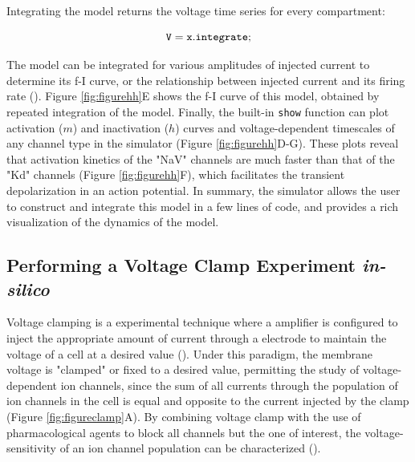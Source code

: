 \documentclass{frontiersSCNS} %
\begin{document}
Integrating the model returns the voltage time series for every compartment:

\begin{equation}
{\tt V = x.integrate;}
\end{equation}

The model can be integrated for various amplitudes of injected current to determine its f-I curve, or the relationship between injected current and its firing rate (\cite{kisperskyIncreaseSodiumConductance2012}). Figure \ref{fig:figurehh}E shows the f-I curve of this model, obtained by repeated integration of the model.  Finally, the built-in \texttt{show} function can plot activation ($m$) and inactivation ($h$) curves and voltage-dependent timescales of any channel type in the simulator (Figure \ref{fig:figurehh}D-G). These plots reveal that activation kinetics of the "NaV" channels are much faster than that of the "Kd" channels (Figure \ref{fig:figurehh}F), which facilitates the transient depolarization in an action potential. In summary, the simulator allows the user to construct and integrate this model in a few lines of code, and provides a rich visualization of the dynamics of the model.


%
%
%
%
%
%




\subsection{Performing a Voltage Clamp Experiment \textit{in-silico}}


Voltage clamping is a experimental technique where a amplifier is configured to inject the appropriate amount of current through a electrode to maintain the voltage of a cell at a desired value (\cite{dayanTheoreticalNeuroscience2001}). Under this paradigm, the membrane voltage is "clamped" or fixed to a desired value, permitting the study of voltage-dependent ion channels, since the sum of all currents through the population of ion channels in the cell is equal and opposite to the current injected by the clamp (Figure \ref{fig:figureclamp}A). By combining voltage clamp with the use of pharmacological agents to block all channels but the one of interest, the voltage-sensitivity of an ion channel population can be characterized (\cite{coleIonicCurrentMeasurements1960, coleIonsPotentialsNerve1955, hodgkinEffectSodiumIons1949, hodgkinMeasurementCurrentvoltageRelations1952, hodgkinQuantitativeDescriptionMembrane1952, turrigianoSelectiveRegulationCurrent1995}).
\end{document}
